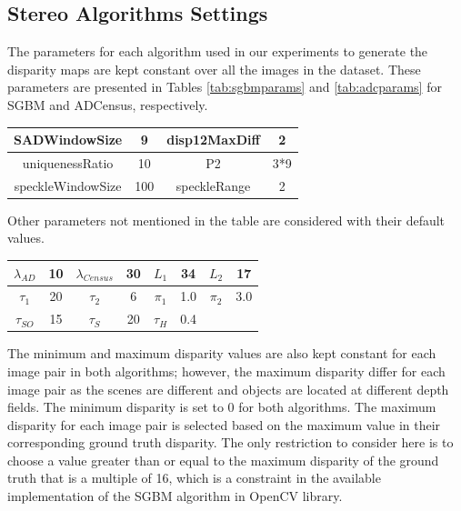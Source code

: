 \subsection{Stereo Algorithms Settings}
The parameters for each algorithm used in our experiments to generate the disparity
maps are kept constant over all the images in the dataset. These parameters are presented in Tables \ref{tab:sgbmparams} and \ref{tab:adcparams} 
for SGBM and ADCensus, respectively. \newline

\begin{minipage}{\linewidth}
\begin{center}
\label{tab:sgbmparams}
\begin{tabular}{ |c|c|c|c|}
\hline
SADWindowSize & 9 & disp12MaxDiff & 2 \\ \hline
uniquenessRatio & 10 & P2 & 3*9 \\ \hline
speckleWindowSize & 100 & speckleRange & 2 \\ \hline
\end{tabular}
\end{center}
\end{minipage} \newline \newline
\noindent
Other parameters not mentioned in the table are considered with their default values. \newline

\begin{minipage}{\linewidth}
\begin{center}
\label{tab:adcparams}
\begin{tabular}{|c|c|c|c|c|c|c|c|}
\hline
$\lambda_{AD}$ & 10 & $\lambda_{Census}$ & 30 & $L_{1}$ & 34 & $L_{2}$ & 17 \\ \hline
$\tau_{1}$ & 20 & $\tau_{2}$ & 6 & $\pi_{1}$ & 1.0 & $\pi_{2}$ & 3.0 \\ \hline 
$\tau_{SO}$ & 15 & $\tau_{S}$ & 20 & $\tau_{H}$ & 0.4 & & \\  \hline
\end{tabular}
\end{center}
\end{minipage} \newline

The minimum and maximum disparity values are also kept constant for each image pair in both algorithms; however, the maximum 
disparity differ for each image pair as the scenes are different
and objects are located at different depth fields.
The minimum disparity is set to $0$ for both algorithms. The maximum disparity for each image pair is selected based on the maximum value in their
corresponding ground truth disparity. The only restriction to consider here is to choose a value greater than or equal to 
the maximum disparity of the ground truth that is a multiple of 16, which is a constraint
in the available implementation of the SGBM algorithm in OpenCV library.

